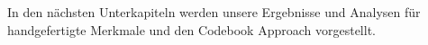 

In den n{\"a}chsten Unterkapiteln werden unsere Ergebnisse und Analysen f{\"u}r handgefertigte Merkmale und den Codebook Approach vorgestellt.










